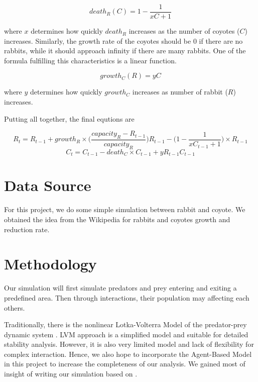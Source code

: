 \documentclass{article}
\begin{document}
\begin{normalsize}
		\begin{equation}
		death_R(C) = 1 - \frac{1}{xC + 1}
		\end{equation}
	
		where $x$ determines how quickly $death_R$ increases as the number of coyotes ($C$) increases. Similarly, the growth rate of the coyotes should be $0$ if there are no rabbits, while it should approach infinity if there are many rabbits. One of the formula fulfilling this characteristics is a linear function.
	
		\begin{equation}
		growth_C(R) = yC
		\end{equation}
	
		
		where $y$ determines how quickly $growth_C$ increases as number of rabbit ($R$) increases.
		
		Putting all together, the final equtions are
		
		
		\begin{equation}
		R_t = R_{t-1} + growth_{R} \times \big( \frac{capacity_{R} - R_{t-1}}{capacity_{R}} \big) R_{t-1} - \big( 1 - \frac{1}{xC_{t-1} + 1} \big)\times R_{t-1}
		\end{equation}
		\begin{equation}
		C_t = C_{t-1} - death_{C} \times C_{t-1} + yR_{t-1}C_{t-1}
		\end{equation}
			
		
		\section{Data Source}
		For this project, we do some simple simulation between rabbit and coyote. We obtained the idea from the Wikipedia for rabbits and coyotes growth and reduction rate.
	
		\section{Methodology}
		Our simulation will first simulate predators and prey entering and exiting a predefined area. Then through interactions, their population may affecting each others.
		
		Traditionally, there is the nonlinear Lotka-Volterra Model of the predator-prey dynamic system \cite{inproceedings, 1102729}. LVM approach is a simplified model and suitable for detailed stability analysis. However, it is also very limited model and lack of flexibility for complex interaction. Hence, we also hope to incorporate the Agent-Based Model \cite{Hodzic} in this project to increase the completeness of our analysis. We gained most of insight of writing our simulation based on \cite{Sayama2013}.
		

\end{normalsize}
\end{document}
